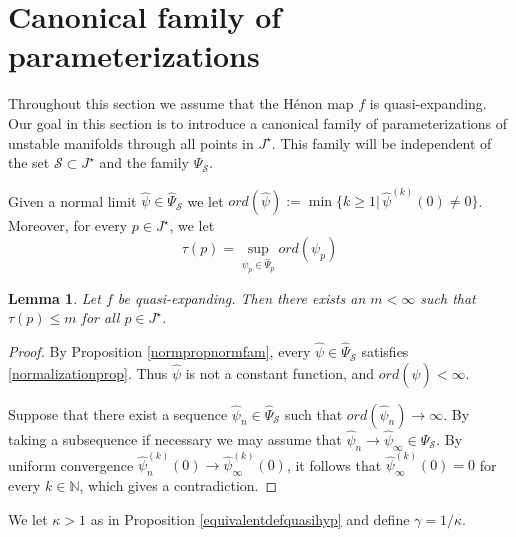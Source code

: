 \documentclass[10pt,a4paper]{article}
\newtheorem{lemma}[theorem]{Lemma}
\begin{document}
\section{Canonical family of parameterizations}\label{section:maximal}

Throughout this section we assume that the H\'enon map $f$ is quasi-expanding. Our goal in this section is to introduce a canonical family of parameterizations of unstable manifolds through all points in $J^\star$. This family will be independent of the set $\mathcal S\subset J^\star$ and the family $\Psi_\mathcal S$.

Given a normal limit $\widehat\psi\in\widehat\Psi_\mathcal S$ we let $ord(\widehat\psi):=\min\{k\geq 1|\,\widehat\psi^{(k)}(0)\neq 0\}$. Moreover, for every $p\in J^\star$, we let
\begin{equation}
\label{tau}
\tau(p)=\sup_{\psi_p\in\widehat\Psi_p}ord(\psi_p)
\end{equation}
\begin{lemma}
\label{taubound}
Let $f$ be quasi-expanding. Then there exists an $m<\infty$ such that $\tau(p)\leq m$ for all $p\in J^\star$.
\end{lemma}
\begin{proof}
By Proposition \ref{normpropnormfam}, every $\widehat\psi\in\widehat \Psi_\mathcal S$ satisfies \eqref{normalizationprop}. Thus $\widehat\psi$ is not a constant function, and $ord(\widehat\psi)<\infty$.

Suppose that there exist a sequence $\widehat\psi_n\in\widehat\Psi_\mathcal S$ such that $ord(\widehat\psi_n)\to\infty$. By taking a subsequence if necessary we may assume that $\widehat\psi_n\to\widehat\psi_\infty\in\widehat\Psi_\mathcal S$. By uniform convergence $\widehat\psi^{(k)}_n(0)\to\widehat\psi_\infty^{(k)}(0)$, it follows that $\widehat\psi_\infty^{(k)}(0)=0$ for every $k\in \mathbb N$, which gives a contradiction.
\end{proof}

We let $\kappa>1$ as in Proposition \ref{equivalentdefquasihyp} and define $\gamma=1/\kappa$.
\end{document}
